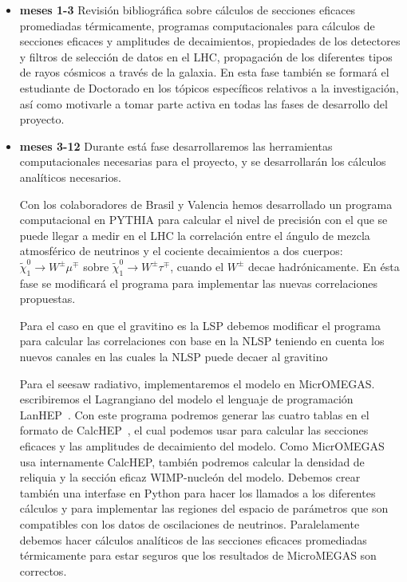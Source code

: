 \begin{itemize}
\item \textbf{meses 1-3} Revisión bibliográfica sobre cálculos de
  secciones eficaces promediadas térmicamente, programas
  computacionales para cálculos de secciones eficaces y amplitudes de
  decaimientos, propiedades de los detectores y filtros de selección
  de datos en el LHC, propagación de los diferentes tipos de rayos
  cósmicos a través de la galaxia.  En esta fase también se formará el
  estudiante de Doctorado en los tópicos específicos relativos a la
  investigación, así como motivarle a tomar parte activa en todas las
  fases de desarrollo del proyecto.

\item \textbf{meses 3-12} Durante está fase desarrollaremos las
  herramientas computacionales necesarias para el proyecto, y se
  desarrollarán los cálculos analíticos necesarios.

\begin{brpvlhc}
  Con los colaboradores de Brasil y Valencia hemos desarrollado un
  programa computacional en PYTHIA para calcular el nivel de precisión
  con el que se puede llegar a medir en el LHC la correlación entre el
  ángulo de mezcla atmosférico de neutrinos y el cociente decaimientos
  a dos cuerpos: $\tilde\chi_1^0\to W^\pm\mu^\mp$ sobre
  $\tilde\chi_1^0\to W^\pm\tau^\mp$, cuando el $W^\pm$ decae
  hadrónicamente.  En ésta fase se modificará el programa para
  implementar las nuevas correlaciones propuestas.
\end{brpvlhc}

\begin{darkmatter}
  Para el caso en que el gravitino es la LSP debemos modificar el
  programa para calcular las correlaciones con base en la NLSP
  teniendo en cuenta los nuevos canales en las cuales la NLSP puede
  decaer al gravitino
\end{darkmatter}



\begin{darkmatter}
  Para el seesaw radiativo, implementaremos el modelo en MicrOMEGAS.
escribiremos el Lagrangiano del modelo el
  lenguaje de programación LanHEP~\cite{Semenov:2008jy}. Con este
  programa podremos generar las cuatro tablas en el formato de
  CalcHEP~\cite{Pukhov:2004ca}, el cual podemos usar para calcular las
  secciones eficaces y las amplitudes de decaimiento del modelo.  Como
  MicrOMEGAS usa internamente CalcHEP, también podremos calcular la
  densidad de reliquia y la sección eficaz WIMP-nucleón del
  modelo. Debemos crear también una interfase en Python para hacer los
  llamados a los diferentes cálculos y para implementar las regiones
  del espacio de parámetros que son compatibles con los datos de
  oscilaciones de neutrinos. Paralelamente debemos hacer cálculos
  analíticos de las secciones eficaces promediadas térmicamente para
  estar seguros que los resultados de MicroMEGAS son correctos.
\end{darkmatter}


\end{itemize}
